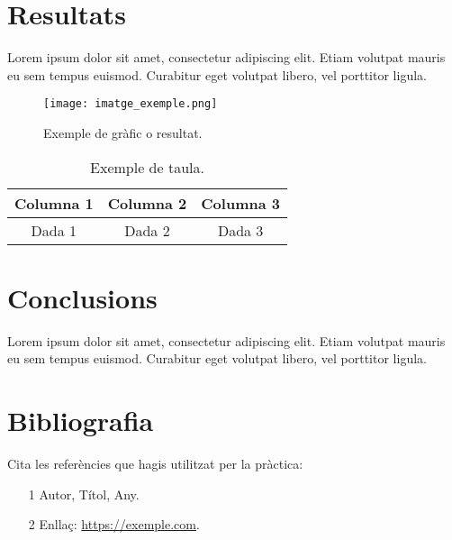 \documentclass[a4paper,12pt]{report}
\begin{document}
\chapter{Resultats}
Lorem ipsum dolor sit amet, consectetur adipiscing elit. Etiam volutpat mauris eu sem
tempus euismod. Curabitur eget volutpat libero, vel porttitor ligula.

\begin{figure}[h!]
    \centering
    \texttt{[image: imatge\_exemple.png]} %
    \caption{Exemple de gràfic o resultat.}
    \label{fig:exemple}
\end{figure}

\begin{table}[h!]
    \centering
    \begin{tabular}{|c|c|c|}
        \hline
        Columna 1 & Columna 2 & Columna 3 \\ \hline
        Dada 1 & Dada 2 & Dada 3 \\ \hline
    \end{tabular}
    \caption{Exemple de taula.}
    \label{tab:exemple}
\end{table}

\chapter{Conclusions}
Lorem ipsum dolor sit amet, consectetur adipiscing elit. Etiam volutpat mauris eu sem
tempus euismod. Curabitur eget volutpat libero, vel porttitor ligula.

\chapter*{Bibliografia}
Cita les referències que hagis utilitzat per la pràctica:
\begin{itemize}
    \item [1] Autor, Títol, Any.
    \item [2] Enllaç: \url{https://exemple.com}.
\end{itemize}

\end{document}
